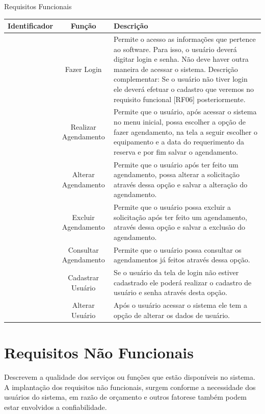 \documentclass[
	12pt,				%
	openright,			%
	twoside,			%
	a4paper,			%
	english,			%
	french,				%
	spanish,			%
	brazil				%
	]{abntex2}
\begin{document}
\begin{quadro}[htb]
	\centering
	\caption{\label{quadro_RF}Requisitos Funcionais}
	\begin{tabular}{|c|c|>{\centering\arraybackslash}p{9cm}|}
		\hline
		\textbf{Identificador} & \textbf{Função} & \textbf{Descrição}\\ \hline
		[RF01] & Fazer Login          & Permite o acesso as informações que
		pertence ao software. Para isso, o usuário
		deverá digitar login e senha. Não deve haver
		outra maneira de acessar o sistema.
		Descrição complementar: Se o usuário não
		tiver login ele deverá efetuar o cadastro que
		veremos no requisito funcional [RF06]
		posteriormente. \\ \hline
		[RF02] & Realizar Agendamento   & Permite que o usuário, após acessar o
		sistema no menu inicial, possa escolher a
		opção de fazer agendamento, na tela a seguir
		escolher o equipamento e a data do
		requerimento da reserva e por fim salvar o
		agendamento. \\ \hline
		[RF03] & Alterar Agendamento    & Permite que o usuário após ter feito um
		agendamento, possa alterar a solicitação
		através dessa opção e salvar a alteração do
		agendamento. \\ \hline
		[RF04] & Excluir Agendamento    & Permite que o usuário possa excluir a
		solicitação após ter feito um agendamento,
		através dessa opção e salvar a exclusão do
		agendamento. \\ \hline
		[RF05] & Consultar Agendamento  & Permite que o usuário possa consultar os
		agendamentos já feitos através dessa opção. \\ \hline
		[RF06] & Cadastrar Usuário      & Se o usuário da tela de login não estiver
		cadastrado ele poderá realizar o cadastro de
		usuário e senha através desta opção. \\ \hline
		[RF07] & Alterar Usuário        & Após o usuário acessar o sistema ele tem a
		opção de alterar os dados de usuário. \\ \hline
	\end{tabular}
\end{quadro}

\section*{Requisitos Não Funcionais}

Descrevem a qualidade dos serviços ou funções que estão disponíveis no
sistema. A implantação dos requisitos não funcionais, surgem conforme a
necessidade dos usuários do sistema, em razão de orçamento e outros fatorese
também podem estar envolvidos a confiabilidade.
\end{document}
